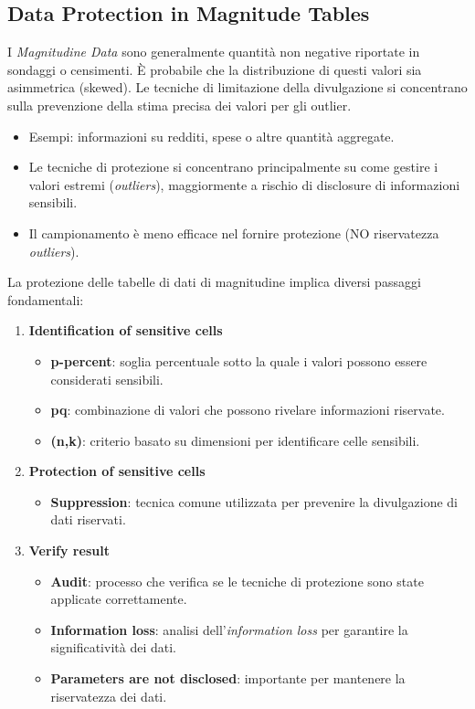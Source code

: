 \documentclass{report}
\begin{document}
\subsection{Data Protection in Magnitude Tables}
I \textit{Magnitudine Data} sono generalmente quantità non negative riportate in sondaggi o censimenti. È probabile che la distribuzione di questi valori sia asimmetrica (skewed). Le tecniche di limitazione della divulgazione si concentrano sulla prevenzione della stima precisa dei valori per gli outlier.

\begin{itemize}
    \item Esempi: informazioni su redditi, spese o altre quantità aggregate.
    \item Le tecniche di protezione si concentrano principalmente su come gestire i valori estremi (\textit{outliers}), maggiormente a rischio di disclosure di informazioni sensibili.
    \item Il campionamento è meno efficace nel fornire protezione (NO riservatezza \textit{outliers}).
\end{itemize}

\noindent La protezione delle tabelle di dati di magnitudine implica diversi passaggi fondamentali:
\begin{enumerate}
    \item \textbf{Identification of sensitive cells}
    \begin{itemize}
        \item \textbf{p-percent}: soglia percentuale sotto la quale i valori possono essere considerati sensibili.
        \item \textbf{pq}: combinazione di valori che possono rivelare informazioni riservate.
        \item \textbf{(n,k)}: criterio basato su dimensioni per identificare celle sensibili.
    \end{itemize}
    
    \item \textbf{Protection of sensitive cells}
    \begin{itemize}
        \item \textbf{Suppression}: tecnica comune utilizzata per prevenire la divulgazione di dati riservati.
    \end{itemize}
    
    \item \textbf{Verify result}
    \begin{itemize}
        \item \textbf{Audit}: processo che verifica se le tecniche di protezione sono state applicate correttamente.
        \item \textbf{Information loss}: analisi dell'\textit{information loss} per garantire la significatività dei dati.
        \item \textbf{Parameters are not disclosed}: importante per mantenere la riservatezza dei dati.
    \end{itemize}
\end{enumerate}
\end{document}
